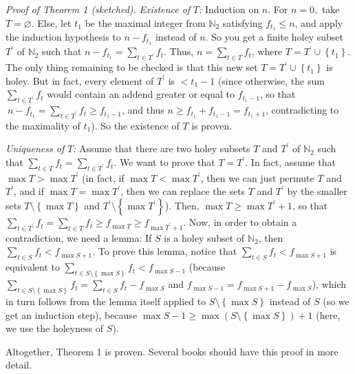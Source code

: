 \documentclass[12pt,final,notitlepage,onecolumn]{article}%
\begin{document}
\textit{Proof of Theorem 1 (sketched).} \textit{Existence of }$T$\textit{:}
Induction on $n$. For $n=0,$ take $T=\varnothing$. Else, let $t_{1}$ be the
maximal integer from $\mathbb{N}_{2}$ satisfying $f_{t_{1}}\leq n$, and apply
the induction hypothesis to $n-f_{t_{1}}$ instead of $n$. So you get a finite
holey subset $T^{\prime}$ of $\mathbb{N}_{2}$ such that $n-f_{t_{1}}%
=\sum\limits_{t\in T^{\prime}}f_{t}$. Thus, $n=\sum\limits_{t\in T}f_{t}$,
where $T=T^{\prime}\cup\left\{  t_{1}\right\}  $. The only thing remaining to
be checked is that this new set $T=T^{\prime}\cup\left\{  t_{1}\right\}  $ is
holey. But in fact, every element of $T^{\prime}$ is $<t_{1}-1$ (since
otherwise, the sum $\sum\limits_{t\in T^{\prime}}f_{t}$ would contain an
addend greater or equal to $f_{t_{1}-1}$, so that$\ n-f_{t_{1}}=\sum
\limits_{t\in T^{\prime}}f_{t}\geq f_{t_{1}-1}$, and thus $n\geq f_{t_{1}%
}+f_{t_{1}-1}=f_{t_{1}+1}$, contradicting to the maximality of $t_{1}$). So
the existence of $T$ is proven.

\textit{Uniqueness of }$T$\textit{:} Assume that there are two holey subsets
$T$ and $T^{\prime}$ of $\mathbb{N}_{2}$ such that $\sum\limits_{t\in T}%
f_{t}=\sum\limits_{t\in T^{\prime}}f_{t}$. We want to prove that $T=T^{\prime
}$. In fact, assume that $\max T>\max T^{\prime}$ (in fact, if $\max T<\max
T^{\prime}$, then we can just permute $T$ and $T^{\prime}$, and if $\max
T=\max T^{\prime}$, then we can replace the sets $T$ and $T^{\prime}$ by the
smaller sets $T\setminus\left\{  \max T\right\}  $ and $T^{\prime}%
\setminus\left\{  \max T^{\prime}\right\}  $). Then, $\max T\geq\max
T^{\prime}+1$, so that $\sum\limits_{t\in T^{\prime}}f_{t}=\sum\limits_{t\in
T}f_{t}\geq f_{\max T}\geq f_{\max T^{\prime}+1}$. Now, in order to obtain a
contradiction, we need a lemma: If $S$ is a holey subset of $\mathbb{N}_{2}$,
then $\sum\limits_{t\in S}f_{t}<f_{\max S+1}$. To prove this lemma, notice
that $\sum\limits_{t\in S}f_{t}<f_{\max S+1}$ is equivalent to $\sum
\limits_{t\in S\setminus\left\{  \max S\right\}  }f_{t}<f_{\max S-1}$ (because
$\sum\limits_{t\in S\setminus\left\{  \max S\right\}  }f_{t}=\sum\limits_{t\in
S}f_{t}-f_{\max S}$ and $f_{\max S-1}=f_{\max S+1}-f_{\max S}$), which in turn
follows from the lemma itself applied to $S\setminus\left\{  \max S\right\}  $
instead of $S$ (so we get an induction step), because $\max S-1\geq\max\left(
S\setminus\left\{  \max S\right\}  \right)  +1$ (here, we use the holeyness of
$S$).

Altogether, Theorem 1 is proven. Several books should have this proof in more detail.
\end{document}
